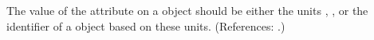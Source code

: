 The value of the attribute  on a \Model object should be
either the units , , or the identifier of a
\UnitDefinition object based on these units.  (References: .)
